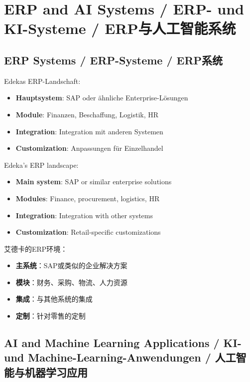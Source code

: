 \chapter{ERP and AI Systems / ERP- und KI-Systeme / ERP与人工智能系统}

\section{ERP Systems / ERP-Systeme / ERP系统}

\begin{otherlanguage}{ngerman}
Edekas ERP-Landschaft:
\begin{itemize}
    \item \textbf{Hauptsystem}: SAP oder ähnliche Enterprise-Lösungen
    \item \textbf{Module}: Finanzen, Beschaffung, Logistik, HR
    \item \textbf{Integration}: Integration mit anderen Systemen
    \item \textbf{Customization}: Anpassungen für Einzelhandel
\end{itemize}
\end{otherlanguage}

Edeka's ERP landscape:
\begin{itemize}
    \item \textbf{Main system}: SAP or similar enterprise solutions
    \item \textbf{Modules}: Finance, procurement, logistics, HR
    \item \textbf{Integration}: Integration with other systems
    \item \textbf{Customization}: Retail-specific customizations
\end{itemize}

艾德卡的ERP环境：
\begin{itemize}
    \item \textbf{主系统}：SAP或类似的企业解决方案
    \item \textbf{模块}：财务、采购、物流、人力资源
    \item \textbf{集成}：与其他系统的集成
    \item \textbf{定制}：针对零售的定制
\end{itemize}

\section{AI and Machine Learning Applications / KI- und Machine-Learning-Anwendungen / 人工智能与机器学习应用}

